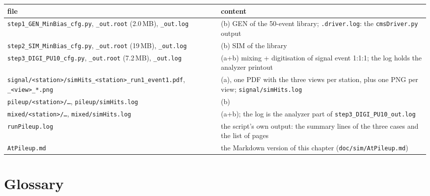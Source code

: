 \documentclass[11pt,a4paper]{article}
\newcommand{\code}[1]{\texttt{#1}}
\begin{document}
\begin{center}\small
\begin{tabularx}{\textwidth}{>{\hsize=1.25\hsize\raggedright\arraybackslash}X>{\hsize=0.75\hsize\raggedright\arraybackslash}X}
\toprule
file & content \\
\midrule
\code{step1\_GEN\_MinBias\_cfg.py}, \code{\_out.root} (2.0\,MB), \code{\_out.log} & (b) GEN of the 50-event library; \code{.driver.log}: the \code{cmsDriver.py} output \\
\code{step2\_SIM\_MinBias\_cfg.py}, \code{\_out.root} (19\,MB), \code{\_out.log} & (b) SIM of the library \\
\code{step3\_DIGI\_PU10\_cfg.py}, \code{\_out.root} (7.2\,MB), \code{\_out.log} & (a+b) mixing + digitisation of signal event 1:1:1; the log holds the analyzer printout \\
\code{signal/<station>/simHits\_<station>\_run1\_event1.pdf}, \code{\_<view>\_*.png} & (a), one PDF with the three views per station, plus one PNG per view; \code{signal/simHits.log} \\
\code{pileup/<station>/\ldots}, \code{pileup/simHits.log} & (b) \\
\code{mixed/<station>/\ldots}, \code{mixed/simHits.log} & (a+b); the log is the analyzer part of \code{step3\_DIGI\_PU10\_out.log} \\
\code{runPileup.log} & the script's own output: the summary lines of the three cases and the list of pages \\
\code{AtPileup.md} & the Markdown version of this chapter (\code{doc/sim/AtPileup.md}) \\
\bottomrule
\end{tabularx}
\end{center}

\section{Glossary}
\label{app:glossary}
\end{document}
